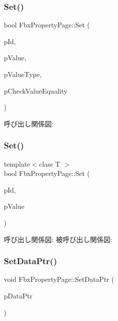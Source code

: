 \subsubsection{\texorpdfstring{Set()}{Set()}\hspace{0.1cm}{\footnotesize\ttfamily [1/2]}}
{\footnotesize\ttfamily bool Fbx\+Property\+Page\+::\+Set (\begin{DoxyParamCaption}\item[{\hyperlink{fbxtypes_8h_a088fa96de3b0b3ea69f0f6afef525dfb}{Fbx\+Int}}]{p\+Id,  }\item[{const void $\ast$}]{p\+Value,  }\item[{\hyperlink{fbxpropertytypes_8h_a73913a5ddfb20e57c6f25e9e6784bd92}{E\+Fbx\+Type}}]{p\+Value\+Type,  }\item[{bool}]{p\+Check\+Value\+Equality }\end{DoxyParamCaption})}

呼び出し関係図\+:
\mbox{\label{class_fbx_property_page_a33ab1efe617ddf50b88ed19cb77161a5}} 
\subsubsection{\texorpdfstring{Set()}{Set()}\hspace{0.1cm}{\footnotesize\ttfamily [2/2]}}
{\footnotesize\ttfamily template$<$class T $>$ \\
bool Fbx\+Property\+Page\+::\+Set (\begin{DoxyParamCaption}\item[{\hyperlink{fbxtypes_8h_a088fa96de3b0b3ea69f0f6afef525dfb}{Fbx\+Int}}]{p\+Id,  }\item[{const T \&}]{p\+Value }\end{DoxyParamCaption})}

呼び出し関係図\+:
被呼び出し関係図\+:
\mbox{\label{class_fbx_property_page_a99e3d4bbf13e51e4f1448e1d18043b54}} 
\subsubsection{\texorpdfstring{Set\+Data\+Ptr()}{SetDataPtr()}}
{\footnotesize\ttfamily void Fbx\+Property\+Page\+::\+Set\+Data\+Ptr (\begin{DoxyParamCaption}\item[{void $\ast$}]{p\+Data\+Ptr }\end{DoxyParamCaption})}

